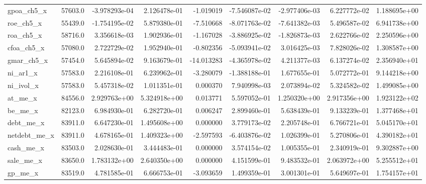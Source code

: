 \documentclass[10pt]{article}
\begin{document}
\begin{landscape}
\begin{longtable}{lrrrrrrrr}
gpoa\_ch5\_x              &   57603.0 & -3.978293e-04 &  2.126478e-01 &     -1.019019 & -7.546087e-02 & -2.977406e-03 &  6.227772e-02 &  1.188695e+00 \\
roe\_ch5\_x               &   55439.0 & -1.754195e-02 &  5.879380e-01 &     -7.510668 & -8.071763e-02 & -7.641382e-03 &  5.496587e-02 &  6.941738e+00 \\
roa\_ch5\_x               &   58716.0 &  3.356618e-03 &  1.902936e-01 &     -1.167028 & -3.886925e-02 & -1.826873e-03 &  2.622766e-02 &  2.250596e+00 \\
cfoa\_ch5\_x              &   57080.0 &  2.722729e-02 &  1.952940e-01 &     -0.802356 & -5.093941e-02 &  3.016425e-03 &  7.828026e-02 &  1.308587e+00 \\
gmar\_ch5\_x              &   57454.0 &  5.645894e-02 &  9.163679e-01 &    -14.013283 & -4.365978e-02 &  4.211377e-03 &  6.137274e-02 &  2.356940e+01 \\
ni\_ar1\_x                &   57583.0 &  2.216108e-01 &  6.239962e-01 &     -3.280079 & -1.388188e-01 &  1.677655e-01 &  5.072772e-01 &  9.144218e+00 \\
ni\_ivol\_x               &   57583.0 &  5.457318e-02 &  1.011351e-01 &      0.000370 &  7.940998e-03 &  2.073894e-02 &  5.324582e-02 &  1.499085e+00 \\
at\_me\_x                 &   84556.0 &  2.929763e+00 &  5.324918e+00 &      0.013771 &  5.597052e-01 &  1.250320e+00 &  2.917356e+00 &  1.923122e+02 \\
be\_me\_x                 &   82123.0 &  6.984930e-01 &  6.282720e-01 &      0.006247 &  2.899460e-01 &  5.638439e-01 &  9.133239e-01 &  1.377468e+01 \\
debt\_me\_x               &   83911.0 &  6.647230e-01 &  1.495608e+00 &      0.000000 &  3.779173e-02 &  2.205748e-01 &  6.766721e-01 &  5.045170e+01 \\
netdebt\_me\_x            &   83911.0 &  4.678165e-01 &  1.409323e+00 &     -2.597593 & -6.403876e-02 &  1.026399e-01 &  5.270806e-01 &  4.390182e+01 \\
cash\_me\_x               &   83503.0 &  2.028630e-01 &  3.444483e-01 &      0.000000 &  3.574154e-02 &  1.005355e-01 &  2.340919e-01 &  9.302887e+00 \\
sale\_me\_x               &   83650.0 &  1.783132e+00 &  2.640350e+00 &      0.000000 &  4.151599e-01 &  9.483532e-01 &  2.063972e+00 &  5.255512e+01 \\
gp\_me\_x                 &   83519.0 &  4.781585e-01 &  6.666753e-01 &     -3.093659 &  1.499359e-01 &  3.001301e-01 &  5.649697e-01 &  1.754157e+01 \\

\end{longtable}
\end{landscape}
\end{document}
